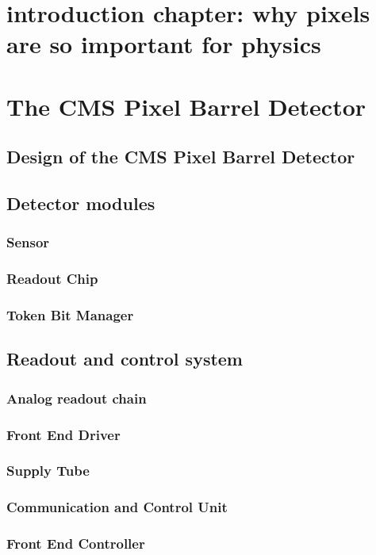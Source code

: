 \chapter{introduction chapter: why pixels are so important for physics}

\chapter{The CMS Pixel Barrel Detector}
\label{ch:BPixIntro}

\section{Design of the CMS Pixel Barrel Detector}
\section{Detector modules}
\subsection{Sensor}
\subsection{Readout Chip}
\subsection{Token Bit Manager}

\section{Readout and control system}
\subsection{Analog readout chain}
\subsection{Front End Driver}
\subsection{Supply Tube}
\subsection{Communication and Control Unit}
\subsection{Front End Controller}

